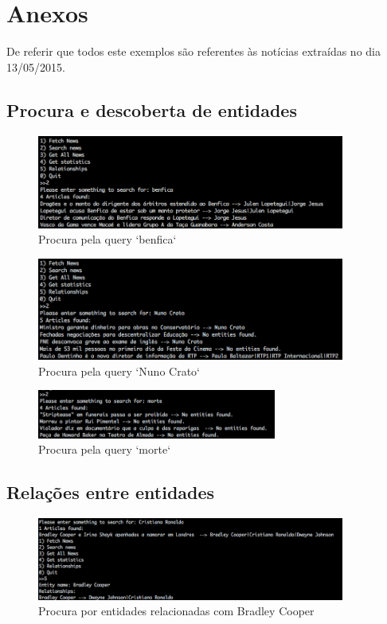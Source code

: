 \section{Anexos} \label{anexos}
De referir que todos este exemplos são referentes às notícias extraídas no dia 13/05/2015.
\subsection{Procura e descoberta de entidades}
\begin{figure}[htbp]
  \centering
    \includegraphics[width=0.9\textwidth]{images/search3.png}
	\caption{Procura pela query `benfica`}
\end{figure}

\begin{figure}[htbp]
  \centering
    \includegraphics[width=0.9\textwidth]{images/search4.png}
	\caption{Procura pela query `Nuno Crato`}
\end{figure}

\begin{figure}[htbp]
  \centering
    \includegraphics[width=0.7\textwidth]{images/search77.png}
	\caption{Procura pela query `morte`}
\end{figure}

\newpage
\subsection{Relações entre entidades}
\begin{figure}[htbp]
  \centering
    \includegraphics[width=0.9\textwidth]{images/search5.png}
	\caption{Procura por entidades relacionadas com Bradley Cooper}
\end{figure}

